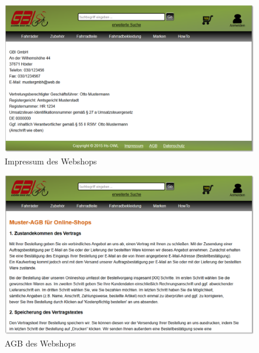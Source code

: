 \begin{figure}[H]
\begin{center}
\includegraphics[width=150mm]{Bilder/Abbildung6-ImpressumDesWebshops.png}
\end{center}
\caption{Impressum des Webshops}
\end{figure}

\begin{figure}[H]
\begin{center}
\includegraphics[width=150mm]{Bilder/Abbildung7-AGBDesWebshops.png}
\end{center}
\caption{AGB des Webshops}
\end{figure}

